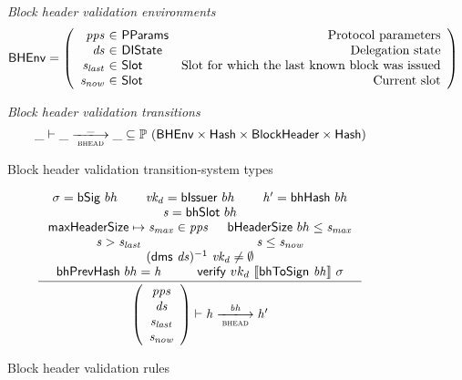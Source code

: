 \documentclass[11pt,a4paper]{article}
\newcommand{\powerset}[1]{\mathbb{P}~#1}
\newcommand{\var}[1]{\mathit{#1}}
\newcommand{\fun}[1]{\mathsf{#1}}
\newcommand{\type}[1]{\mathsf{#1}}
\newcommand{\trans}[2]{\xlongrightarrow[\textsc{#1}]{#2}}
\newcommand{\serialised}[1]{\llbracket \var{#1} \rrbracket}
\newcommand{\Hash}{\type{Hash}}  %
\newcommand{\Slot}{\type{Slot}}
\newcommand{\DelegState}{\type{DIState}}
\newcommand{\ProtParams}{\type{PParams}} %
\newcommand{\bhdrsizename}{bHeaderSize}
\newcommand{\verifyname}{verify}
\newcommand{\bsigname}{bSig}
\newcommand{\bissuername}{bIssuer}
\newcommand{\verify}[3]{\fun{\verifyname} ~ #1 ~ #2 ~ #3}
\newcommand{\bhdrsize}[1]{\fun{\bhdrsizename} ~ #1}
\newcommand{\bsig}[1]{\fun{\bsigname} ~ #1}
\newcommand{\bissuer}[1]{\fun{\bissuername} ~ #1}
\begin{document}
\begin{figure}[ht]
  \emph{Block header validation environments}
  \begin{equation*}
    \BHEnv =
    \left(
      \begin{array}{r@{~\in~}lr}
        \var{pps} & \ProtParams & \text{Protocol parameters} \\
        \var{ds} & \DelegState & \text{Delegation state} \\
        \var{s_{last}} & \Slot & \text{Slot for which the last known block was issued} \\
        \var{s_{now}} & \Slot & \text{Current slot} \\
      \end{array}
    \right)
  \end{equation*}

  \emph{Block header validation transitions}
  \begin{equation*}
    \_ \vdash \var{\_} \trans{bhead}{\_} \var{\_} \subseteq
    \powerset (\BHEnv \times \Hash \times \Bhead \times \Hash)
  \end{equation*}
  \caption{Block header validation transition-system types}
  \label{fig:ts-types:bhead}
\end{figure}

\begin{figure}[ht]
  \begin{equation*}
    \inference
    { \sigma = \bsig{bh} & \var{vk_d} = \bissuer{bh} & \var{h'} = \bhhash{bh}
    \\ \var{s} = \bhslot{bh}
    \\ \maxheadersize \mapsto \var{s_{max}} \in \var{pps} & \bhdrsize{bh} \leq \var{s_{max}}
    \\ \var{s} > \var{s_{last}} & \var{s} \leq \var{s_{now}}
    \\  (\fun{dms} ~ \var{ds})^{-1} ~ \var{vk_d} \neq \emptyset
    \\ \bhprevhash{bh} = \var{h} & \verify{vk_d}{\serialised{\bhtosign{bh}}}{\sigma}
    }
    {
      \left(
        {\begin{array}{c}
           \var{pps} \\
           \var{ds} \\
           \var{s_{last}} \\
           \var{s_{now}} \\
        \end{array}}
      \right)
      \vdash
        {\var{h}}
      \trans{bhead}{\var{bh}}
        {\var{h'}}
    }
  \end{equation*}
  \caption{Block header validation rules}
  \label{fig:rules:bhead}
\end{figure}
\end{document}
